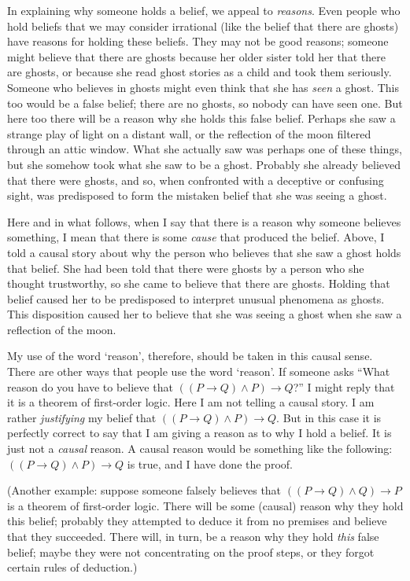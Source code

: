 \documentclass[12pt,twoside]{reedfancy}
\begin{document}
\begin{spacing}{1.25}
In explaining why someone holds a belief, we appeal to {\em reasons}.
Even people who hold beliefs that we may consider irrational (like the
belief that there are ghosts) have reasons for holding these beliefs.
They may not be good reasons; someone might believe that there are
ghosts because her older sister told her that there are ghosts, or
because she read ghost stories as a child and took them seriously.
Someone who believes in ghosts might even think that she has {\em
  seen} a ghost.  This too would be a false belief; there are no
ghosts, so nobody can have seen one.  But here too there will be a
reason why she holds this false belief.  Perhaps she saw a strange
play of light on a distant wall, or the reflection of the moon
filtered through an attic window.  What she actually saw was perhaps
one of these things, but she somehow took what she saw to be a ghost.
Probably she already believed that there were ghosts, and so, when
confronted with a deceptive or confusing sight, was predisposed to
form the mistaken belief that she was seeing a ghost.

Here and in what follows, when I say that there is a reason why
someone believes something, I mean that there is some {\em cause} that
produced the belief.  Above, I told a causal story about why the
person who believes that she saw a ghost holds that belief.  She had
been told that there were ghosts by a person who she thought
trustworthy, so she came to believe that there are ghosts.  Holding
that belief caused her to be predisposed to interpret unusual
phenomena as ghosts.  This disposition caused her to believe that she
was seeing a ghost when she saw a reflection of the moon.

My use of the word `reason', therefore, should be taken in this causal
sense.  There are other ways that people use the word `reason'.  If
someone asks ``What reason do you have to believe that $((P
\rightarrow Q ) \wedge P) \rightarrow Q$?''  I might reply that it is
a theorem of first-order logic.  Here I am not telling a causal story.
I am rather {\em justifying} my belief that $((P \rightarrow Q )
\wedge P) \rightarrow Q$.  But in this case it is perfectly correct to
say that I am giving a reason as to why I hold a belief.  It is just
not a {\em causal} reason.  A causal reason would be something like
the following: $((P \rightarrow Q ) \wedge P) \rightarrow Q$ is true,
and I have done the proof.

(Another example: suppose someone falsely believes that $((P
\rightarrow Q ) \wedge Q) \rightarrow P$ is a theorem of first-order
logic.  There will be some (causal) reason why they hold this belief;
probably they attempted to deduce it from no premises and believe that
they succeeded.  There will, in turn, be a reason why they hold {\em
  this} false belief; maybe they were not concentrating on the proof
steps, or they forgot certain rules of deduction.)


\end{spacing}
\end{document}

